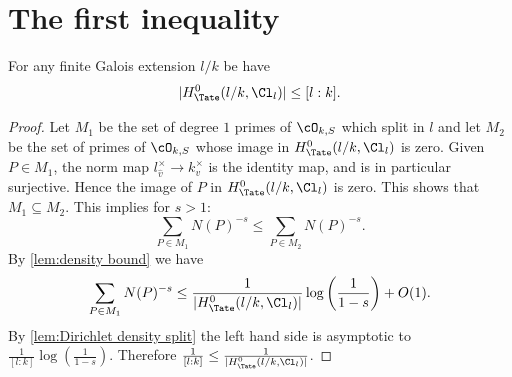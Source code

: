 





\section{The first inequality}

\begin{theorem} \label{thm:first inequality}
	For any finite Galois extension $l/k$ be have
	\[
		|H^0_{\Tate}(l/k, \Cl_{l}) | \le [l : k].
	\]
\end{theorem}

\begin{proof}
	Let $M_1$ be the set of degree $1$ primes of $\cO_{k,S}$ which split in $l$ and let $M_2$ be the
	set of primes of $\cO_{k,S}$ whose image in $H^0_{\Tate}(l/k,\Cl_l)$ is zero.
	Given $P \in M_1$, the norm map $l_{\hat v}^\times \to k_v^\times$ is the identity map, and is
	in particular surjective. Hence the image of $P$ in $H^0_{\Tate}(l/k,\Cl_l)$ is zero.
	This shows that $M_1 \subseteq M_2$.
	This implies for $s> 1$:
	\[
		\sum_{P \in M_1} N(P)^{-s}
		\le \sum_{P \in M_2} N(P)^{-s} .
	\]
	By \ref{lem:density bound} we have
	\[
		\sum_{P \in M_1} N(P)^{-s}
		\le
		\frac{1}{|H^0_{\Tate}(l/k,\Cl_l)|} \log \left(\frac{1}{1-s}\right) + O(1).
	\]
	By \ref{lem:Dirichlet density split} the left hand side is asymptotic to
	$\frac{1}{[l:k]}\log \left(\frac{1}{1-s}\right)$.
	Therefore $\frac{1}{[l:k]} \le \frac{1}{|H^0_{\Tate}(l/k,\Cl_l)|}$.
\end{proof}


